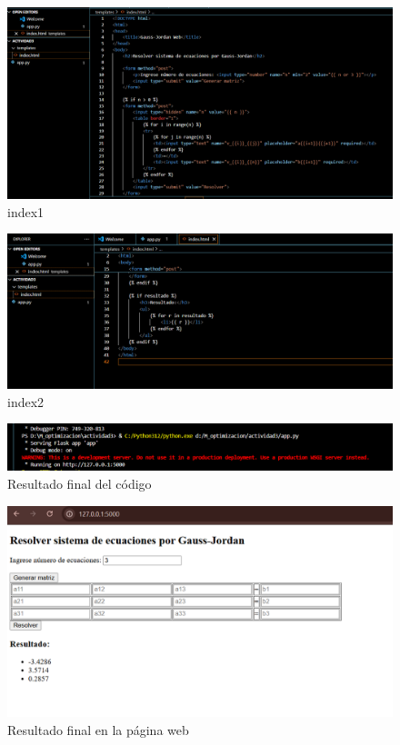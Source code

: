 \documentclass{article}
\begin{document}
\begin{figure}[h!]
    \centering
    \includegraphics[width=\textwidth]{images/index1.png}
    \caption{index1}
    \label{fig:index1}
\end{figure}

\begin{figure}[h!]
    \centering
    \includegraphics[width=\textwidth]{images/index2.png}
    \caption{index2}
    \label{fig:index2}
\end{figure}

\begin{figure}[h!]
    \centering
    \includegraphics[width=\textwidth]{images/resultadoapp.png}
    \caption{Resultado final del código}
    \label{fig:resultadoapp}
\end{figure}

\begin{figure}[h!]
    \centering
    \includegraphics[width=\textwidth]{images/resultado5.png}
    \caption{Resultado final en la página web}
    \label{fig:resultado5}
\end{figure}
\end{document}
